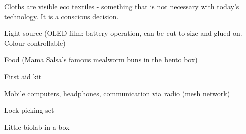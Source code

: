 \newpage
\begin{npcBox}[title=Primrose continued]
    \begin{npcDescription}
    Cloths are visible eco textiles - something that is not necessary with today's technology. It is a conscious decision.
    \end{npcDescription}


    \begin{equipment}
    \item Light source (OLED film: battery operation, can be cut to size and glued on. Colour controllable)
    \item Food (Mama Salsa's famous mealworm buns in the bento box)
    \item First aid kit
    \item Mobile computers, headphones, communication via radio (mesh network)
    \item Lock picking set
    \item Little biolab in a box
    \end{equipment}
\end{npcBox}



